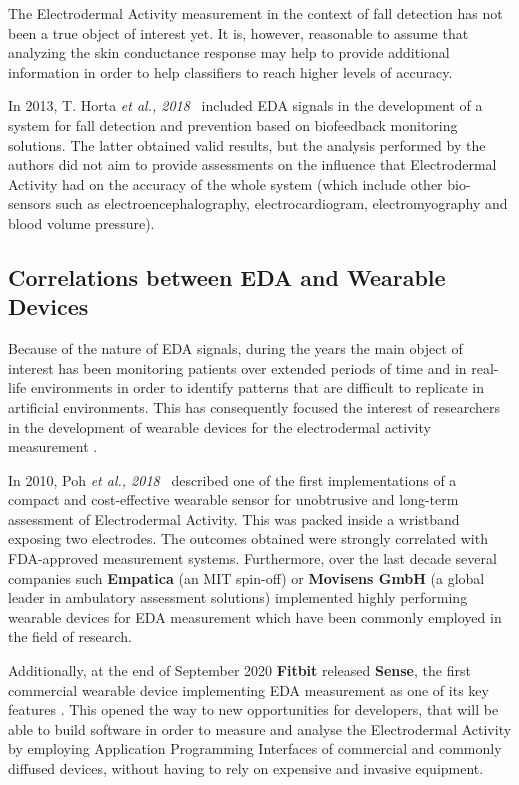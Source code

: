 The Electrodermal Activity measurement in the context of fall detection has not been a true object of interest yet. It is, however, reasonable to assume that analyzing the skin conductance response may help to provide additional information in order to help classifiers to reach higher levels of accuracy. 

In 2013, T. Horta \textit{et al., 2018}~\cite{eda-fall-detection} included EDA signals in the development of a system for fall detection and prevention based on biofeedback monitoring solutions. The latter obtained valid results, but the analysis performed by the authors did not aim to provide assessments on the influence that Electrodermal Activity had on the accuracy of the whole system (which include other bio-sensors such as electroencephalography, electrocardiogram, electromyography and blood volume pressure).

\subsection{Correlations between EDA and Wearable Devices}\label{subsec:eda-wearables}

Because of the nature of EDA signals, during the years the main object of interest has been monitoring patients over extended periods of time and in real-life environments in order to identify patterns that are difficult to replicate in artificial environments. This has consequently focused the interest of researchers in the development of wearable devices for the electrodermal activity measurement \cite{poh-wearable}. 

In 2010, Poh \textit{et al., 2018}~\cite{poh-wearable} described one of the first implementations of a compact and cost-effective wearable sensor for unobtrusive and long-term assessment of Electrodermal Activity. This was packed inside a wristband exposing two electrodes. The outcomes obtained were strongly correlated with FDA-approved measurement systems. Furthermore, over the last decade several companies such \textbf{Empatica} (an MIT spin-off) or \textbf{Movisens GmbH} (a global leader in ambulatory assessment solutions) implemented highly performing wearable devices for EDA measurement which have been commonly employed in the field of research.

Additionally, at the end of September 2020 \textbf{Fitbit} released \textbf{Sense}, the first commercial wearable device implementing EDA measurement as one of its key features \cite{fitbit-eda}. This opened the way to new opportunities for developers, that will be able to build software in order to measure and analyse the Electrodermal Activity by employing Application Programming Interfaces of commercial and commonly diffused devices, without having to rely on expensive and invasive equipment.



